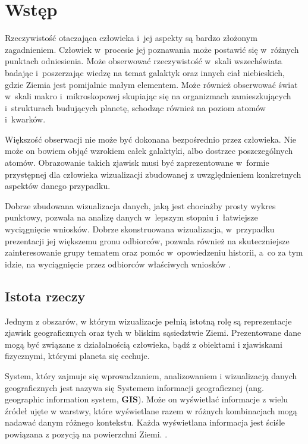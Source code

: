 \chapter{Wstęp}

Rzeczywistość otaczająca człowieka i~jej aspekty są bardzo złożonym zagadnieniem. Człowiek w~procesie jej poznawania może postawić się w~różnych punktach odniesienia. Może obserwować rzeczywistość w~skali wszechświata badając i~poszerzając wiedzę na temat galaktyk oraz innych ciał niebieskich, gdzie Ziemia jest pomijalnie małym elementem. Może również obserwować świat w~skali makro i~mikroskopowej skupiając się na organizmach zamieszkujących i~strukturach budujących planetę, schodząc również na poziom atomów i~kwarków. 

Większość obserwacji nie może być dokonana bezpośrednio przez człowieka. Nie może on bowiem objąć wzrokiem całek galaktyki, albo dostrzec poszczególnych atomów. Obrazowanie takich zjawisk musi być zaprezentowane w~formie przystępnej dla człowieka wizualizacji zbudowanej z uwzględnieniem konkretnych aspektów danego przypadku. 

Dobrze zbudowana wizualizacja danych, jaką jest chociażby prosty wykres punktowy, pozwala na analizę danych w~lepszym stopniu i~łatwiejsze wyciągnięcie wniosków. Dobrze skonstruowana wizualizacja, w~przypadku prezentacji jej większemu gronu odbiorców, pozwala również na skuteczniejsze zainteresowanie grupy tematem oraz pomóc w~opowiedzeniu historii, a~co za tym idzie, na wyciągnięcie przez odbiorców właściwych wniosków \cite{StorytellingWithData}.

\section{Istota rzeczy}

Jednym z obszarów, w którym wizualizacje pełnią istotną rolę są reprezentacje zjawisk geograficznych oraz tych w bliskim sąsiedztwie Ziemi. Prezentowane dane mogą być związane z działalnością człowieka, bądź z obiektami i zjawiskami fizycznymi, którymi planeta się cechuje.

System, który zajmuje się wprowadzaniem, analizowaniem i wizualizacją danych geograficznych jest nazywa się Systemem informacji geograficznej (ang. geographic information system, \textbf{GIS}). Może on wyświetlać informacje z wielu źródeł ujęte w warstwy, które wyświetlane razem w różnych kombinacjach mogą nadawać danym różnego kontekstu. Każda wyświetlana informacja jest ściśle powiązana z pozycją na powierzchni Ziemi. \cite[Rozdział 1.6]{IntroductionToHumanGeography}.

